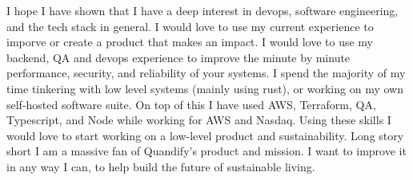 \documentclass[../../main.tex]{subfiles}
\begin{document}
I hope I have shown that I have a deep interest in devops, software engineering, and the tech stack in general. I would love to use my current experience to imporve or create a product that makes an impact. I would love to use my backend, QA and devops experience to improve the minute by minute performance, security, and reliability of your systems. I spend the majority of my time tinkering with low level systems (mainly using rust), or working on my own self-hosted software suite. On top of this I have used AWS, Terraform, QA, Typescript, and Node while working for AWS and Nasdaq. Using these skills I would love to start working on a low-level product and sustainability. Long story short I am a massive fan of Quandify's product and mission. I want to improve it in any way I can, to help build the future of sustainable living.
\\
\end{document}
